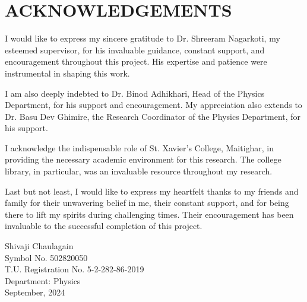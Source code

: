 \chapter*{ACKNOWLEDGEMENTS}

I would like to express my sincere gratitude to Dr. Shreeram Nagarkoti, my esteemed supervisor, for his invaluable guidance, constant support, and encouragement throughout this project. His expertise and patience were instrumental in shaping this work.
\vspace{10pt}

\noindent I am also deeply indebted to Dr. Binod Adhikhari, Head of the Physics Department, for his support and encouragement. My appreciation also extends to Dr. Basu Dev Ghimire, the Research Coordinator of the Physics Department, for his support.
\vspace{10pt}

\noindent I acknowledge the indispensable role of St. Xavier’s College, Maitighar, in providing the necessary academic environment for this research. The college library, in particular, was an invaluable resource throughout my research.
\vspace{10pt}

\noindent Last but not least, I would like to express my heartfelt thanks to my friends and family for their unwavering belief in me, their constant support, and for being there to lift my spirits during challenging times. Their encouragement has been invaluable to the successful completion of this project.

\begin{flushright}
	\vspace{30pt}
	Shivaji Chaulagain \\
	Symbol No. 502820050 \\
	T.U. Registration No. 5-2-282-86-2019 \\
	Department: Physics \\
	September, 2024
\end{flushright}